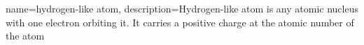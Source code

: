 {
    name=hydrogen-like atom,
    description={Hydrogen-like atom is any atomic nucleus with one electron orbiting it. It carries a positive charge at the atomic number of the atom}
}
